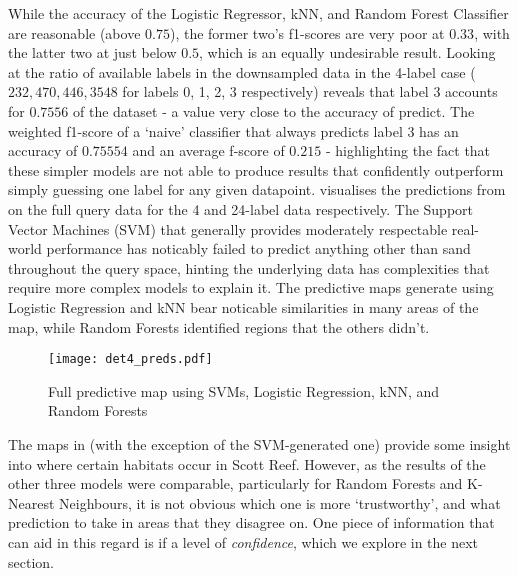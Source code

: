While the accuracy of the Logistic Regressor, kNN, and Random Forest Classifier are reasonable (above $0.75$), the former two's f1-scores are very poor at $0.33$, with the latter two at just below $0.5$, which is an equally undesirable result. Looking at the ratio of available labels in the downsampled data in the 4-label case ($232,  470,  446, 3548$ for labels 0, 1, 2, 3 respectively) reveals that label 3 accounts for $0.7556$ of the dataset - a value very close to the accuracy of predict. The weighted f1-score of a `naive' classifier that always predicts label 3 has an accuracy of  $0.75554$ and an average f-score of $0.215$ - highlighting the fact that these simpler models are not able to produce results that confidently outperform simply guessing one label for any given datapoint.  visualises the predictions from  on the full query data for the 4 and 24-label data respectively. The Support Vector Machines (SVM) that generally provides moderately respectable real-world performance has noticably failed to predict anything other than sand throughout the query space, hinting the underlying data has complexities that require more complex models to explain it. The predictive maps generate using Logistic Regression and kNN bear noticable similarities in many areas of the map, while Random Forests identified regions that the others didn't. 

\begin{figure}[H]
    \texttt{[image: det4\_preds.pdf]}
    \caption{Full predictive map using SVMs, Logistic Regression, kNN, and Random Forests}
    \label{fig:det4maps}
\end{figure}

The maps in  (with the exception of the SVM-generated one) provide some insight into where certain habitats occur in Scott Reef. However, as the results of the other three models were comparable, particularly for Random Forests and K-Nearest Neighbours, it is not obvious which one is more `trustworthy', and what prediction to take in areas that they disagree on. One piece of information that can aid in this regard is if a level of \textit{confidence}, which we explore in the next section.

